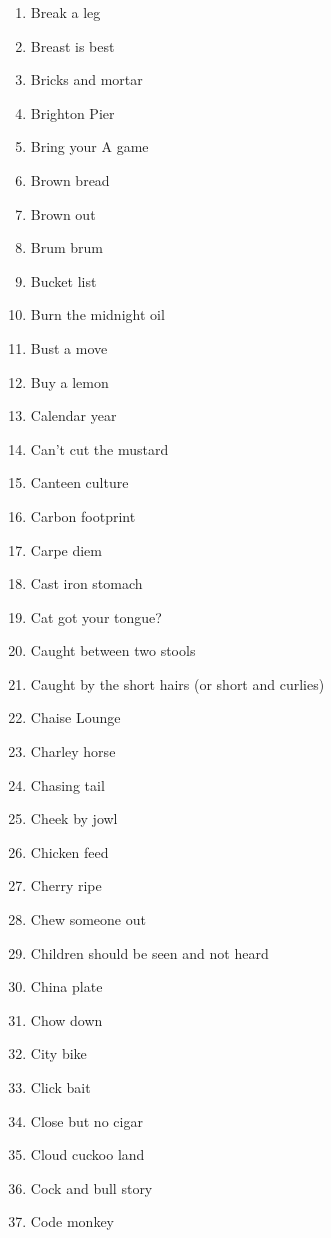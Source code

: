 \begin{enumerate}
        \item  Break a leg
        \item  Breast is best
        \item  Bricks and mortar
        \item  Brighton Pier
        \item  Bring your A game
        \item  Brown bread
        \item  Brown out
        \item  Brum brum
        \item  Bucket list
        \item  Burn the midnight oil
        \item  Bust a move
        \item  Buy a lemon
        \item  Calendar year
        \item  Can't cut the mustard
        \item  Canteen culture
        \item  Carbon footprint
        \item  Carpe diem
        \item  Cast iron stomach
        \item  Cat got your tongue?
        \item  Caught between two stools
        \item  Caught by the short hairs (or short and curlies)
        \item  Chaise Lounge
        \item  Charley horse
        \item  Chasing tail
        \item  Cheek by jowl
        \item  Chicken feed
        \item  Cherry ripe
        \item  Chew someone out
        \item  Children should be seen and not heard
        \item  China plate
        \item  Chow down
        \item  City bike
        \item  Click bait
        \item  Close but no cigar
        \item  Cloud cuckoo land
        \item  Cock and bull story
        \item  Code monkey

\end{enumerate}
